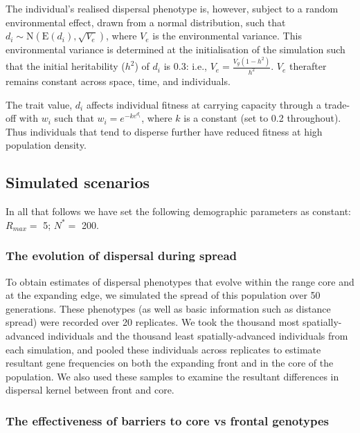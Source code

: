 \documentclass{article}
\begin{document}
The individual's realised dispersal
phenotype is, however, subject to a random environmental effect, drawn from a normal distribution, such
that \(d_i\sim\text{N}(\text{E}(d_i), \sqrt{V_e})\), where \(V_e\) is
the environmental variance. This environmental variance is determined at
the initialisation of the simulation such that the initial heritability ($h^2$)
of \(d_i\) is 0.3: i.e., \(V_e=\frac{V_g(1-h^2)}{h^2}\). \(V_e\)
therafter remains constant across space, time, and individuals.

The trait value, \(d_i\) affects individual fitness at carrying capacity
through a trade-off with \(w_i\) such that \(w_i=e^{-ke^{d_i}}\), where $k$ is a constant (set to 0.2 throughout). Thus
individuals that tend to disperse further have reduced fitness at high
population density.

\subsection{Simulated scenarios}

In all that follows we have set the following demographic parameters as
constant: \(R_{max}=\) 5; \(N^*=\) 200.

\subsubsection{The evolution of dispersal during
spread}

To obtain estimates of dispersal phenotypes that evolve within the range
core and at the expanding edge, we simulated the spread of this
population over 50 generations. These phenotypes (as well as basic
information such as distance spread) were recorded over 20 replicates.
We took the thousand most spatially-advanced individuals and the
thousand least spatially-advanced individuals from each simulation, and
pooled these individuals across replicates to estimate resultant gene
frequencies on both the expanding front and in the core of the
population. We also used these samples to examine the resultant
differences in dispersal kernel between front and core.

\subsubsection{The effectiveness of barriers to core vs frontal
genotypes}
\end{document}
